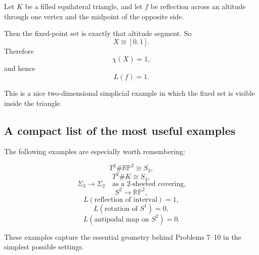 \documentclass[12pt,a4paper]{article}
\newcommand{\RP}{\mathbb{RP}}
\theoremstyle{notespace}
\begin{document}
Let \(K\) be a filled equilateral triangle, and let \(f\) be reflection across an altitude through one vertex and the midpoint of the opposite side.

Then the fixed-point set is exactly that altitude segment. So
\[
X\cong [0,1].
\]
Therefore
\[
\chi(X)=1,
\]
and hence
\[
L(f)=1.
\]

This is a nice two-dimensional simplicial example in which the fixed set is visible inside the triangle.

\subsection{A compact list of the most useful examples}

The following examples are especially worth remembering:

\[
T^2\#\RP^2\cong S_3,
\]
\[
T^2\#K\cong S_4,
\]
\[
\Sigma_3\to\Sigma_2 \quad \text{as a 2-sheeted covering,}
\]
\[
S^2\to\RP^2,
\]
\[
L(\text{reflection of interval})=1,
\]
\[
L(\text{rotation of }S^1)=0,
\]
\[
L(\text{antipodal map on }S^2)=0.
\]

These examples capture the essential geometry behind Problems 7--10 in the simplest possible settings.
\end{document}
